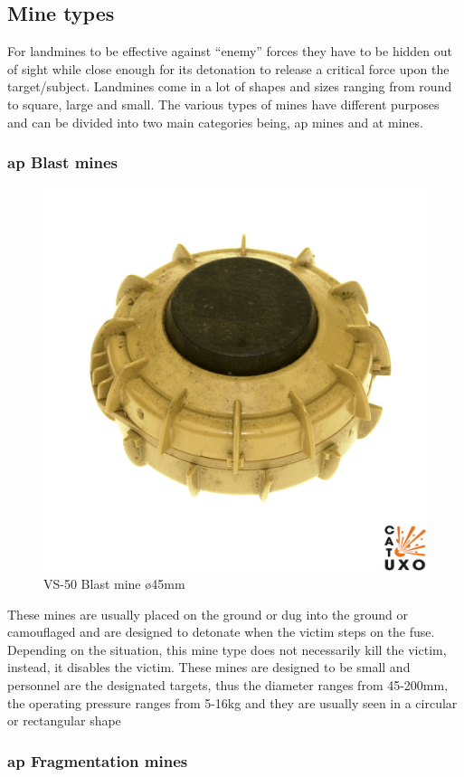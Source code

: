 \subsection{Mine types}
For landmines to be effective against “enemy” forces they have to be hidden out of sight while close enough for its detonation to release a critical force upon the target/subject. Landmines come in a lot of shapes and sizes ranging from round to square, large and small. The various types of mines have different purposes and can be divided into two main categories being, \gls{ap} mines and \gls{at} mines.


\subsubsection*{\gls{ap} Blast mines} 

\begin{figure}
\vspace{-8mm}
\centering
\includegraphics[width=0.5\linewidth]{00 - Images/vs-50-001.jpg}
  \caption{VS-50 Blast mine ø45mm \cite{vs-50}}
  \label{fig:vs-50}
\end{figure}

These mines are usually placed on the ground or dug into the ground or camouflaged and are designed to detonate when the victim steps on the fuse. Depending on the situation, this mine type does not necessarily kill the victim, instead, it disables the victim. These mines are designed to be small and personnel are the designated targets, thus the diameter ranges from 45-200mm, the operating pressure ranges from 5-16kg and they are usually seen in a circular or rectangular shape \cite{mine_detection}\cite{landmines_and_mine_action}

\newpage

\subsubsection*{\gls{ap} Fragmentation mines}

